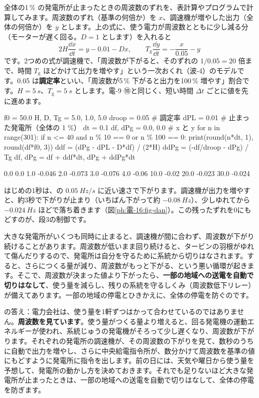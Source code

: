 \begin{motto}[5]
\label{ph:電-16:prog}%
全体の1\,\% の発電所が止まったときの周波数のずれを、表計算やプログラムで計算してみます。周波数のずれ（基準の何倍か）を $x$、調速機が増やした出力（全体の何倍か）を $y$ とします。上の式に、使う電力が周波数とともに少し減る分（モーターが遅く回る。$D=1$ とします）を入れると
\[2H\frac{\dd x}{\dd t}=y-0.01-Dx,\qquad T_{\mathrm g}\frac{\dd y}{\dd t}=-\frac{x}{0.05}-y\]
です。2つめの式が調速機で、「周波数が下がると、そのずれの $1/0.05=20$ 倍まで、時間 $T_{\mathrm g}$ ほどかけて出力を増やす」という一次おくれ（波-4）のモデルです。0.05 は\textbf{調定率}といい、「周波数が5\,\% 下がると出力を100\,\% 増やす」割合です。$H=\qty{5}{s}$、$T_{\mathrm g}=\qty{5}{s}$ とします。電-9 ⑩と同じく、短い時間 $\Delta t$ ごとに値を先に進めます。
\begin{phcode}[Python]
f0 = 50.0
H, D, Tg = 5.0, 1.0, 5.0
droop = 0.05    \# 調定率
dPL = 0.01      \# 止まった発電所（全体の 1 \%）
dt = 0.1
df, dPg = 0.0, 0.0   \# x と y
for n in range(301):
    if n <= 40 and n \% 10 == 0 or n \% 100 == 0:
        print(round(n*dt, 1), round(df*f0, 3))
    ddf = (dPg - dPL - D*df) / (2*H)
    ddPg = (-df/droop - dPg) / Tg
    df, dPg = df + ddf*dt, dPg + ddPg*dt
\end{phcode}
\begin{phcodeout}
0.0 0.0
1.0 -0.046
2.0 -0.073
3.0 -0.076
4.0 -0.06
10.0 -0.02
20.0 -0.023
30.0 -0.024
\end{phcodeout}
はじめの1秒は、の $\qty{0.05}{Hz/s}$ に近い速さで下がります。調速機が出力を増やすと、約3秒で下がりが止まり（いちばん下がって約 $-\qty{0.08}{Hz}$）、少しゆれてから $-\qty{0.024}{Hz}$ ほどで落ち着きます（図\ref{ph:電-16:fig-dan}）。この残ったずれを0にもどすのが、段3の制御です。
\end{motto}


大きな発電所がいくつも同時に止まると、調速機が間に合わず、周波数が下がり続けることがあります。周波数が低いまま回り続けると、タービンの羽根がゆれて傷んだりするので、発電所は自分を守るために系統から切りはなされます。すると、さらにつくる量が減り、周波数がもっと下がる、という悪い循環が起きます。そこで、周波数が決まった値より下がったら、\textbf{一部の地域への送電を自動で切りはなして}、使う量を減らし、残りの系統を守るしくみ（周波数低下リレー）が備えてあります。一部の地域の停電とひきかえに、全体の停電を防ぐのです。

\bkhatenaref の答え：電力会社は、使う量を1軒ずつはかって合わせているのではありません。\textbf{周波数を見ています}。使う量がつくる量より増えると、回る発電機の運動エネルギーが使われ、系統じゅうの発電機がそろって少し遅くなり、周波数が下がります。それぞれの発電所の調速機が、その周波数の下がりを見て、数秒のうちに自動で出力を増やし、さらに中央給電指令所が、数分かけて周波数を基準の値にもどすように発電所に指令を出します。前の日には、天気や曜日から使う量を予想して、発電所の動かし方を決めておきます。それでも足りないほど大きな発電所が止まったときは、一部の地域への送電を自動で切りはなして、全体の停電を防ぎます。

